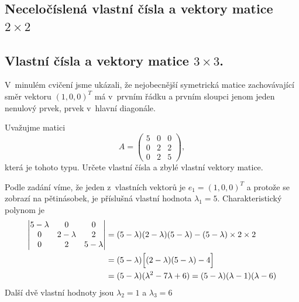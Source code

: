 


\stranka
\subsection{Neceločíslená vlastní čísla a vektory matice $2\times 2$}

 
\stranka
\subsection{Vlastní čísla a vektory matice $3\times 3$.}

V minulém cvičení jsme ukázali, že nejobecnější symetrická matice zachovávající směr vektoru  $(1,0,0)^T$ má v prvním řádku a prvním sloupci jenom jeden nenulový prvek, prvek v hlavní diagonále.

Uvažujme matici
\begin{equation*}
A=  \begin{pmatrix}
  5 & 0 & 0\\
  0 & 2 & 2\\
  0 & 2 & 5
\end{pmatrix},
\end{equation*}
která je tohoto typu.
Určete vlastní čísla a zbylé vlastní vektory matice.


\reseni
Podle zadání víme, že jeden z vlastních vektorů je $e_1=(1,0,0)^T$ a protože se zobrazí na pětinásobek, je příslušná vlastní hodnota $\lambda_1=5$. Charakteristický polynom je
\begin{equation*}
  \begin{aligned}
  \begin{vmatrix}
  5-\lambda & 0 & 0\\
  0 & 2-\lambda & 2\\
  0 & 2 & 5-\lambda
\end{vmatrix}
&=(5-\lambda)(2-\lambda)(5-\lambda)-(5-\lambda)\times 2\times 2\\& =
(5-\lambda)\Bigl[(2-\lambda)(5-\lambda) -4\Bigr]
\\&=(5-\lambda)(\lambda^2 -7\lambda +6)
=(5-\lambda)(\lambda-1)(\lambda-6)
\end{aligned}
\end{equation*}
Další dvě vlastní hodnoty jsou $\lambda_2=1$ a $\lambda_3=6$

